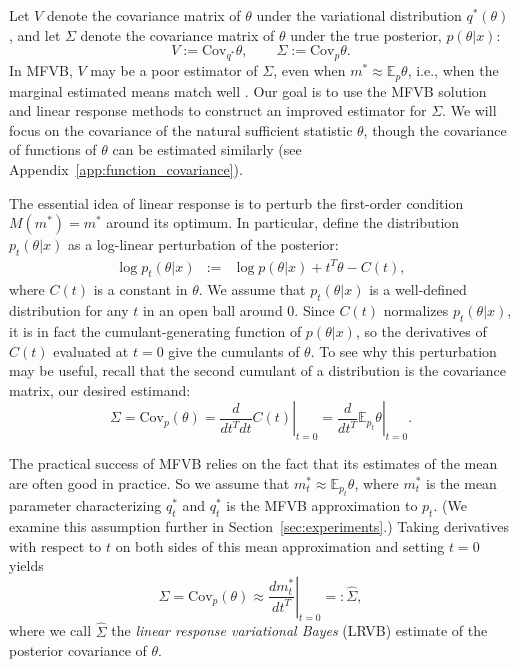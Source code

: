 \documentclass{article}\usepackage[]{graphicx}\usepackage[]{color}
\newcommand{\app}[1]{Appendix~\ref{app:#1}}
\newcommand{\mysec}[1]{Section~\ref{sec:#1}}
\newcommand{\mpq}{m} %
\newcommand{\mpopt}{m^*} %
\newcommand{\truecov}{\Sigma} %
\newcommand{\lrcov}{\hat{\Sigma}} %
\newcommand{\vbcov}{V} %
\newcommand{\constant}{C} %
\theoremstyle{plain}
\newcommand{\mbe}{\mathbb{E}}
\newcommand{\cov}{\textrm{Cov}}
\begin{document}
Let $\vbcov$ denote the covariance matrix of $\theta$ under
the variational distribution $q^{*}(\theta)$, and let $\truecov$ denote the
covariance matrix of $\theta$ under the true posterior,
%
$p(\theta | x)$:
$$
\vbcov := \cov_{q^{*}} \theta,
\quad \quad
\truecov := \cov_{p} \theta.
$$
%
In MFVB, $\vbcov$ may be a poor estimator of $\truecov$, even when $\mpopt
\approx \mbe_{p} \theta$, i.e., when the marginal estimated means match well
\citep{wang:2005:inadequacy, bishop:2006:pattern, turner:2011:two}. Our goal is
to use the MFVB solution and linear response methods to construct an improved
estimator for $\truecov$.  We will focus on the covariance of the natural
sufficient statistic $\theta$, though the covariance of functions of $\theta$
can be estimated similarly (see \app{function_covariance}).

The essential idea of linear response is to perturb the first-order condition
$M(\mpopt) = \mpopt$ around its optimum. In particular, define the distribution
$p_{t}\left(\theta\vert x\right)$ as a log-linear perturbation of the posterior:
%
\begin{eqnarray} \label{eq:perturbed_dens}
\log p_{t}\left(\theta\vert x \right) & := &
    \log p\left(\theta\vert x \right) + t^{T}\theta - \constant\left( t\right),
\end{eqnarray}
%
where $\constant\left( t\right)$ is a constant in $\theta$. We assume that $p_t
(\theta \vert x)$ is a well-defined distribution for any $t$ in an open ball
around 0. Since $\constant\left( t\right)$ normalizes $p_t(\theta \vert x)$, it
is in fact the cumulant-generating function of $p(\theta \vert x)$, so the
derivatives of $\constant\left( t\right)$ evaluated at $t=0$ give the cumulants
of $\theta$. To see why this perturbation may be useful, recall that the second
cumulant of a distribution is the covariance matrix, our desired estimand:
%
$$
  \truecov = \cov_{p}(\theta) = \left. \frac{d}{dt^T dt} C(t) \right|_{t=0} = \left. \frac{d}{dt^T} \mbe_{p_t} \theta \right|_{t=0}.
$$

The practical success of MFVB relies on the fact that its estimates of the mean
are often good in practice. So we assume that $\mpopt_t \approx \mbe_{p_t}
\theta$, where $\mpopt_t$ is the mean parameter characterizing $q_t^*$ and
$q_t^*$ is the MFVB approximation to $p_t$. (We examine this assumption further
in \mysec{experiments}.) Taking derivatives with respect to $t$ on both sides of
this mean approximation and setting $t=0$ yields
%
\begin{equation}\label{eq:lrvb_derivative_defn}
  \truecov = \cov_{p}(\theta) \approx \left. \frac{d\mpq^*_t}{dt^T} \right|_{t=0} =: \lrcov,
\end{equation}
%
where we call $\lrcov$ the \emph{linear response variational Bayes} (LRVB)
estimate of the posterior covariance of $\theta$.
\end{document}
